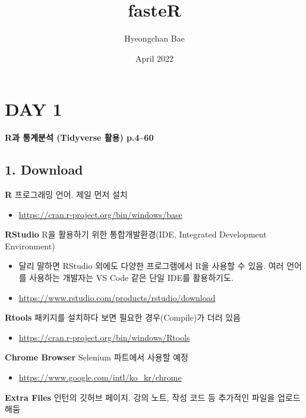 \documentclass[
  12,
]{article}
\title{fasteR}
\author{Hyeongchan Bae}
\date{April 2022}
\providecommand{\tightlist}{%
  \setlength{\itemsep}{0pt}\setlength{\parskip}{0pt}}
\begin{document}
\maketitle

\hypertarget{day-1}{%
\section{DAY 1}\label{day-1}}

\textbf{R과 통계분석 (Tidyverse 활용) p.4\textasciitilde60}

\hypertarget{download}{%
\subsection{1. Download}\label{download}}

\textbf{R} 프로그래밍 언어. 제일 먼저 설치

\begin{itemize}
\tightlist
\item
  \url{https://cran.r-project.org/bin/windows/base}
\end{itemize}

\textbf{RStudio} R을 활용하기 위한 통합개발환경(IDE, Integrated
Development Environment)

\begin{itemize}
\item
  달리 말하면 RStudio 외에도 다양한 프로그램에서 R을 사용할 수 있음.
  여러 언어를 사용하는 개발자는 VS Code 같은 단일 IDE를 활용하기도.
\item
  \url{https://www.rstudio.com/products/rstudio/download}
\end{itemize}

\textbf{Rtools} 패키지를 설치하다 보면 필요한 경우(Compile)가 더러 있음

\begin{itemize}
\tightlist
\item
  \url{https://cran.r-project.org/bin/windows/Rtools}
\end{itemize}

\textbf{Chrome Browser} Selenium 파트에서 사용할 예정

\begin{itemize}
\tightlist
\item
  \url{https://www.google.com/intl/ko_kr/chrome}
\end{itemize}

\textbf{Extra Files} 인턴의 깃허브 페이지. 강의 노트, 작성 코드 등
추가적인 파일을 업로드 해둠
\end{document}
